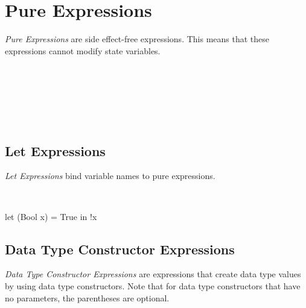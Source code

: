 \chapter{Pure Expressions}
\emph{Pure Expressions} are side effect-free expressions. This means
that these expressions cannot modify state variables.

\begin{abssyntax}
      {}
                {}
                {}
                {}
                {}
                {}
                {}
                {}
                {}
                {}
                {}
                \TRS{(}  \TRS{)}\\
     {}\\
  {}\ \ \\
      {}\\
  {}\ 
\end{abssyntax}


\section{Let Expressions}
\emph{Let Expressions} bind variable names to pure expressions.

\begin{abssyntax}
  {}\ \TRS{(}  \TRS{)}\ \TRS{=}\ \ \ 
\end{abssyntax}

\begin{absexample}
let (Bool x) = True in !x  
\end{absexample}

\section{Data Type Constructor Expressions}
\emph{Data Type Constructor Expressions} are expressions that create data type values by using data type constructors.
Note that for data type constructors that have no parameters, the parentheses are optional.

\begin{abssyntax}
  {}
                    {}\ \TRS{(}  \TRS{)}
\end{abssyntax}

